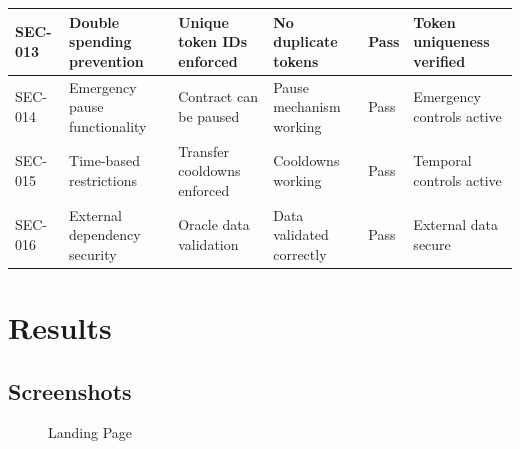 \documentclass[oneside,a4paper,12pt]{book}
\begin{document}
\begin{longtable}{|p{1.2cm}|p{3cm}|p{2.3cm}|p{2.3cm}|p{1.5cm}|p{2cm}|}
\hline
SEC-013 & Double spending prevention & Unique token IDs enforced & No duplicate tokens & Pass & Token uniqueness verified \\
\hline
SEC-014 & Emergency pause functionality & Contract can be paused & Pause mechanism working & Pass & Emergency controls active \\
\hline
SEC-015 & Time-based restrictions & Transfer cooldowns enforced & Cooldowns working & Pass & Temporal controls active \\
\hline
SEC-016 & External dependency security & Oracle data validation & Data validated correctly & Pass & External data secure \\
\hline

\end{longtable}


\chapter{Results}
\newpage
\section{Screenshots}

\begin{center}
    \begin{figure}[!htbp]
        \centering
        \caption{Landing Page}
    \end{figure}
\end{center}
\end{document}
